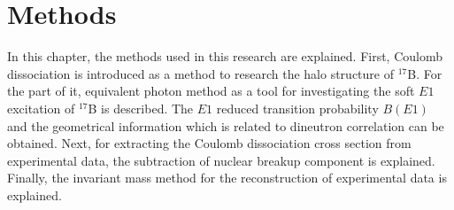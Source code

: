 \chapter{Methods}

In this chapter, the methods used in this research are explained. First, Coulomb dissociation is introduced as a method to research the halo structure of $^{17}$B. For the part of it, equivalent photon method as a tool for investigating the soft $E1$ excitation of $^{17}$B is described. The $E1$ reduced transition probability $B(E1)$ and the geometrical information which is related to dineutron correlation can be obtained. Next, for extracting the Coulomb dissociation cross section from experimental data, the subtraction of nuclear breakup component is explained. Finally, the invariant mass method for the reconstruction of experimental data is explained. 

